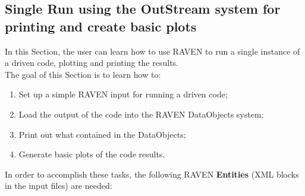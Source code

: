 \subsection{Single Run using the OutStream system for printing and create basic plots}
\label{sub:SingleRunBasicPlots}
 In this Section, the user can learn how to use RAVEN to run a single instance of a driven code, plotting and printing the
 results.
 \\ The goal of this Section is to learn how to:
 \begin{enumerate}
   \item Set up a simple RAVEN input for running a driven code;
   \item Load the output of the code into the RAVEN DataObjects system;
   \item Print out what contained in the DataObjects;
   \item Generate basic plots of the code results.
\end{enumerate}
In order to accomplish these tasks, the following RAVEN \textbf{Entities} (XML blocks in the input files) are needed:

